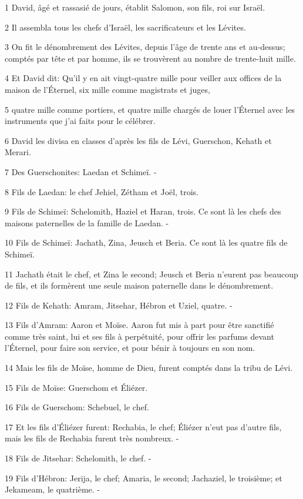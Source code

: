 \par 1 David, âgé et rassasié de jours, établit Salomon, son fils, roi sur Israël.
\par 2 Il assembla tous les chefs d'Israël, les sacrificateurs et les Lévites.
\par 3 On fit le dénombrement des Lévites, depuis l'âge de trente ans et au-dessus; comptés par tête et par homme, ils se trouvèrent au nombre de trente-huit mille.
\par 4 Et David dit: Qu'il y en ait vingt-quatre mille pour veiller aux offices de la maison de l'Éternel, six mille comme magistrats et juges,
\par 5 quatre mille comme portiers, et quatre mille chargés de louer l'Éternel avec les instruments que j'ai faits pour le célébrer.
\par 6 David les divisa en classes d'après les fils de Lévi, Guerschon, Kehath et Merari.
\par 7 Des Guerschonites: Laedan et Schimeï. -
\par 8 Fils de Laedan: le chef Jehiel, Zétham et Joël, trois.
\par 9 Fils de Schimeï: Schelomith, Haziel et Haran, trois. Ce sont là les chefs des maisons paternelles de la famille de Laedan. -
\par 10 Fils de Schimeï: Jachath, Zina, Jeusch et Beria. Ce sont là les quatre fils de Schimeï.
\par 11 Jachath était le chef, et Zina le second; Jeusch et Beria n'eurent pas beaucoup de fils, et ils formèrent une seule maison paternelle dans le dénombrement.
\par 12 Fils de Kehath: Amram, Jitsehar, Hébron et Uziel, quatre. -
\par 13 Fils d'Amram: Aaron et Moïse. Aaron fut mis à part pour être sanctifié comme très saint, lui et ses fils à perpétuité, pour offrir les parfums devant l'Éternel, pour faire son service, et pour bénir à toujours en son nom.
\par 14 Mais les fils de Moïse, homme de Dieu, furent comptés dans la tribu de Lévi.
\par 15 Fils de Moïse: Guerschom et Éliézer.
\par 16 Fils de Guerschom: Schebuel, le chef.
\par 17 Et les fils d'Éliézer furent: Rechabia, le chef; Éliézer n'eut pas d'autre fils, mais les fils de Rechabia furent très nombreux. -
\par 18 Fils de Jitsehar: Schelomith, le chef. -
\par 19 Fils d'Hébron: Jerija, le chef; Amaria, le second; Jachaziel, le troisième; et Jekameam, le quatrième. -
